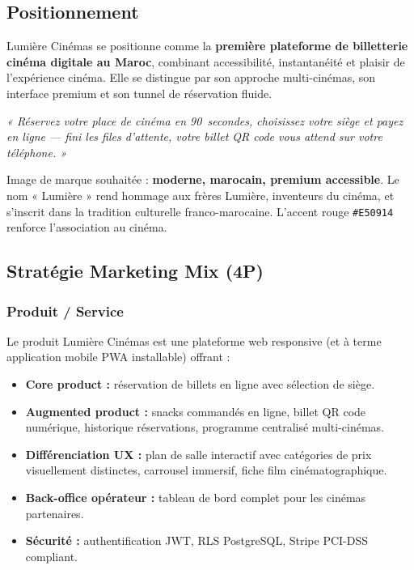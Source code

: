 \documentclass[12pt,a4paper,openany]{report}
\begin{document}
\subsection{Positionnement}

Lumière Cinémas se positionne comme la \textbf{première plateforme de billetterie cinéma digitale au Maroc}, combinant accessibilité, instantanéité et plaisir de l'expérience cinéma. Elle se distingue par son approche multi-cinémas, son interface premium et son tunnel de réservation fluide.

\begin{infobox}
\textit{« Réservez votre place de cinéma en 90~secondes, choisissez votre siège et payez en ligne — fini les files d'attente, votre billet QR code vous attend sur votre téléphone. »}
\end{infobox}

Image de marque souhaitée : \textbf{moderne, marocain, premium accessible}. Le nom « Lumière » rend hommage aux frères Lumière, inventeurs du cinéma, et s'inscrit dans la tradition culturelle franco-marocaine. L'accent rouge \texttt{\#E50914} renforce l'association au cinéma.

\subsection{Stratégie Marketing Mix (4P)}

\subsubsection{Produit / Service}

Le produit Lumière Cinémas est une plateforme web responsive (et à terme application mobile PWA installable) offrant :
\begin{itemize}
  \item \textbf{Core product :} réservation de billets en ligne avec sélection de siège.
  \item \textbf{Augmented product :} snacks commandés en ligne, billet QR code numérique, historique réservations, programme centralisé multi-cinémas.
  \item \textbf{Différenciation UX :} plan de salle interactif avec catégories de prix visuellement distinctes, carrousel immersif, fiche film cinématographique.
  \item \textbf{Back-office opérateur :} tableau de bord complet pour les cinémas partenaires.
  \item \textbf{Sécurité :} authentification JWT, RLS PostgreSQL, Stripe PCI-DSS compliant.
\end{itemize}
\end{document}
